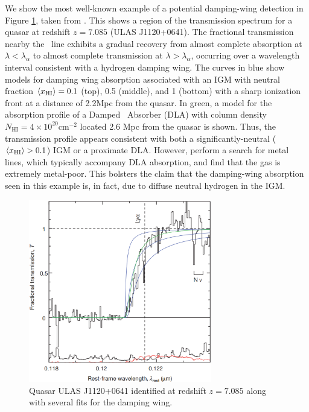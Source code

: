We show the most well-known example of a potential damping-wing detection in Figure \ref{fig:Mortlock}, taken from \cite{Mortlock2011}. This shows a region of the transmission spectrum for a quasar at redshift $z = 7.085$ (ULAS J1120+0641). The fractional transmission nearby the \lya\ line exhibits a gradual recovery from almost complete absorption at $\lambda < \lambda_{\alpha}$ to almost complete transmission at $\lambda > \lambda_{\alpha}$, occurring over a wavelength interval consistent with a hydrogen damping wing. The curves in blue show models for damping wing absorption associated with an IGM with neutral fraction $\langle x_{\text{HI}}\rangle = 0.1$ (top), 0.5 (middle), and 1 (bottom) with a sharp ionization front at a distance of 2.2Mpc from the quasar. In green, a model for the absorption profile of a Damped \lya\ Absorber (DLA) with column density $N_{\text{HI}} = 4\times10^{20}\text{cm}^{-2}$ located 2.6 Mpc from the quasar is shown. Thus, the transmission profile appears consistent with both a significantly-neutral ($\langle x_{\text{HI}}\rangle > 0.1$) IGM or a proximate DLA. However, \cite{Simcoe} perform a search for metal lines, which typically accompany DLA absorption, and find that the gas is extremely metal-poor. This bolsters the claim that the damping-wing absorption seen in this example is, in fact, due to diffuse neutral hydrogen in the IGM. 


\begin{figure}[h]
  \centering
  \includegraphics[width=8cm]{z7p085_DampingWing.eps}
  \caption{Quasar ULAS J1120+0641 identified at redshift $z = 7.085$ along with several fits for the damping wing.}
  \label{fig:Mortlock}
\end{figure}


